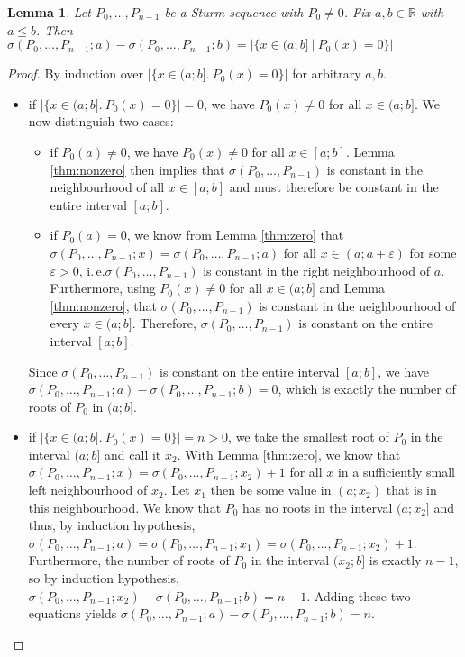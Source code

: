 \documentclass[11pt,a4paper,oneside]{article}
\newtheorem{lemma}[definition]{Lemma}
\newcommand{\RR}{\mathbb{R}}
\renewcommand{\epsilon}{\varepsilon}
\newcommand{\ie}{i.\,e.\xspace}
\begin{document}
\label{thm:count_roots_between}
\begin{lemma}
Let $P_0,\ldots,P_{n-1}$ be a Sturm sequence with $P_0\neq 0$. Fix $a,b\in\RR$ with $a \leq b$. Then $\sigma(P_0,\ldots,P_{n-1}; a)-\sigma(P_0,\ldots,P_{n-1}; b) = |\{x\in (a;b]\ |\ P_0(x)=0\}|$\\
\end{lemma}
\begin{proof}
By induction over $|\{x\in (a;b].\ P_0(x)=0\}|$ for arbitrary $a, b$.
\begin{itemize}
\item if $|\{x\in (a;b].\ P_0(x)=0\}|=0$, we have $P_0(x)\neq 0$ for all $x\in (a;b]$. We now distinguish two cases:
\begin{itemize}
\item if $P_0(a)\neq 0$, we have $P_0(x)\neq 0$ for all $x\in[a;b]$. Lemma \ref{thm:nonzero} then implies that $\sigma(P_0,\ldots,P_{n-1})$ is constant in the neighbourhood of all $x\in[a;b]$ and must therefore be constant in the entire interval $[a;b]$.
\item if $P_0(a)=0$, we know from Lemma \ref{thm:zero} that $\sigma(P_0,\ldots,P_{n-1}; x)=\sigma(P_0,\ldots,P_{n-1}; a)$ for all $x\in(a;a+\epsilon)$ for some $\epsilon > 0$, \ie $\sigma(P_0,\ldots,P_{n-1})$ is constant in the right neighbourhood of $a$. Furthermore, using $P_0(x)\neq 0$ for all $x\in(a;b]$ and Lemma \ref{thm:nonzero}, that $\sigma(P_0,\ldots,P_{n-1})$ is constant in the neighbourhood of every $x\in(a;b]$. Therefore, $\sigma(P_0,\ldots,P_{n-1})$ is constant on the entire interval $[a;b]$.
\end{itemize}
Since $\sigma(P_0,\ldots,P_{n-1})$ is constant on the entire interval $[a;b]$, we have $\sigma(P_0,\ldots,P_{n-1}; a)-\sigma(P_0,\ldots,P_{n-1}; b) = 0$, which is exactly the number of roots of $P_0$ in $(a;b]$.

\item if $|\{x\in (a;b].\ P_0(x)=0\}|=n>0$, we take the smallest root of $P_0$ in the interval $(a;b]$ and call it $x_2$. With Lemma \ref{thm:zero}, we know that $\sigma(P_0,\ldots,P_{n-1};x) = \sigma(P_0,\ldots,P_{n-1};x_2)+1$ for all $x$ in a sufficiently small left neighbourhood of $x_2$. Let $x_1$ then be some value in $(a;x_2)$ that is in this neighbourhood. We know that $P_0$ has no roots in the interval $(a;x_2]$ and thus, by induction hypothesis, $\sigma(P_0,\ldots,P_{n-1};a)=\sigma(P_0,\ldots,P_{n-1};x_1)=\sigma(P_0,\ldots,P_{n-1};x_2)+1$. Furthermore, the number of roots of $P_0$ in the interval $(x_2;b]$ is exactly $n-1$, so by induction hypothesis, $\sigma(P_0,\ldots,P_{n-1};x_2)-\sigma(P_0,\ldots,P_{n-1};b) = n-1$. Adding these two equations yields $\sigma(P_0,\ldots,P_{n-1};a)-\sigma(P_0,\ldots,P_{n-1};b) = n$.
\end{itemize}
\end{proof}
\end{document}
